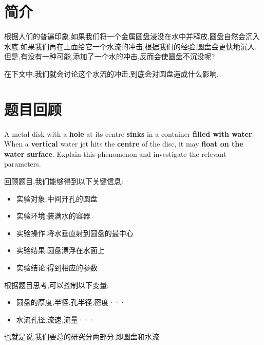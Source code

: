 \documentclass[UTF8]{gapd}
\begin{document}
\maketitle


\section{简介}
\label{sec:unsinkable_disc_introduction}
根据人们的普遍印象,如果我们将一个金属圆盘浸没在水中并释放,圆盘自然会沉入水底.如果我们再在上面给它一个水流的冲击,根据我们的经验,圆盘会更快地沉入.但是,有没有一种可能,添加了一个水的冲击,反而会使圆盘不沉没呢?

在下文中,我们就会讨论这个水流的冲击,到底会对圆盘造成什么影响.

\section{题目回顾}
\label{sec:unsinkable_disc_title_review}
A metal disk with a \textbf{hole} at its centre \textbf{sinks} in a container \textbf{filled with water}. When a \textbf{vertical} water jet hits the \textbf{centre} of the disc, it may \textbf{float on the water surface}. Explain this phenomenon and investigate the relevant parameters.

回顾题目,我们能够得到以下关键信息:
\begin{itemize}
    \item 实验对象:中间开孔的圆盘
    \item 实验环境:装满水的容器
    \item 实验操作:将水垂直射到圆盘的最中心
    \item 实验结果:圆盘漂浮在水面上
    \item 实验结论:得到相应的参数
\end{itemize}

根据题目思考,可以控制以下变量:
\begin{itemize}
    \item 圆盘的厚度,半径,孔半径,密度···
    \item 水流孔径,流速,流量···
\end{itemize}

也就是说,我们要总的研究分两部分,即圆盘和水流
%
\end{document}
